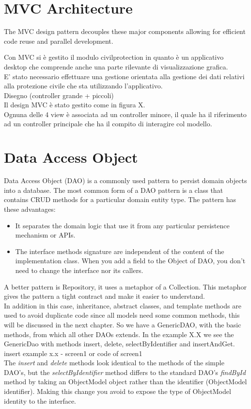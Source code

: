 \documentclass[a4paper,12pt]{report}
\begin{document}
\section{MVC Architecture}
The MVC design pattern decouples these major components allowing for efficient code reuse and parallel development.

Con MVC si è gestito il modulo civilprotection in quanto è un applicativo desktop che comprende anche una parte rilevante di visualizzazione grafica.\\
E' stato necessario effettuare una gestione orientata alla gestione dei dati relativi alla protezione civile che sta utilizzando l'applicativo.\\
Disegno (controller grande + piccoli)\\
Il design MVC è stato gestito come in figura X.\\
Ognuna delle 4 view è associata ad un controller minore, il quale ha il riferimento ad un controller principale che ha il compito di interagire col modello.


\section{Data Access Object}
Data Access Object (DAO) is a commonly used pattern to persist domain objects into a database. The most common form of a DAO pattern is a class that contains CRUD methods for a particular domain entity type.
The pattern has these advantages:
\begin{itemize}
\item It separates the domain logic that use it from any particular persistence mechanism or APIs.
\item The interface methods signature are independent of the content of the implementation class. When you add a field to the Object of DAO, you don’t need to change the interface nor its callers.
\end{itemize}

A better pattern is Repository, it uses a metaphor of a Collection. This metaphor gives the pattern a tight contract and make it easier to understand.\\
In addition in this case, inheritance, abstract classes, and template methods are used to avoid duplicate code since all models need some common methods, this will be discussed in the next chapter.
So we have a GenericDAO, with the basic methods, from which all other DAOs extends.
In the example X.X we see the GenericDao with methods insert, delete, selectByIdentifier and insertAndGet.
\\{insert example x.x - screen1 or code of screen1}\\
The \textit{insert} and \textit{delete} methods look identical to the methods of the simple DAO's, but the \textit{selectByIdentifier} method differs to the standard DAO’s \textit{findById} method by taking an ObjectModel object rather than the identifier (ObjectModel identifier). 
Making this change you avoid to expose the type of ObjectModel identity to the interface.
\end{document}
